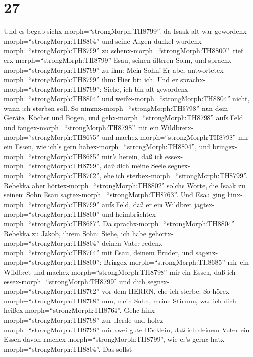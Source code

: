 \hypertarget{section-26}{%
\section{27}\label{section-26}}

 Und es begab sichx-morph=``strongMorph:TH8799'', da Isaak
alt war gewordenx-morph=``strongMorph:TH8804'' und seine Augen dunkel
wurdenx-morph=``strongMorph:TH8799'' zu
sehenx-morph=``strongMorph:TH8800'', rief
erx-morph=``strongMorph:TH8799'' Esau, seinen älteren Sohn, und
sprachx-morph=``strongMorph:TH8799'' zu ihm: Mein Sohn! Er aber
antwortetex-morph=``strongMorph:TH8799'' ihm: Hier bin ich. 
Und er sprachx-morph=``strongMorph:TH8799'': Siehe, ich bin alt
gewordenx-morph=``strongMorph:TH8804'' und
weißx-morph=``strongMorph:TH8804'' nicht, wann ich sterben soll.
 So nimmx-morph=``strongMorph:TH8798'' nun dein Geräte,
Köcher und Bogen, und gehx-morph=``strongMorph:TH8798'' aufs Feld und
fangex-morph=``strongMorph:TH8798'' mir ein
Wildbretx-morph=``strongMorph:TH8675''  und
machex-morph=``strongMorph:TH8798'' mir ein Essen, wie ich's gern
habex-morph=``strongMorph:TH8804'', und
bringex-morph=``strongMorph:TH8685'' mir's herein, daß ich
essex-morph=``strongMorph:TH8799'', daß dich meine Seele
segnex-morph=``strongMorph:TH8762'', ehe ich
sterbex-morph=``strongMorph:TH8799''.  Rebekka aber
hörtex-morph=``strongMorph:TH8802'' solche Worte, die Isaak zu seinem
Sohn Esau sagtex-morph=``strongMorph:TH8763''. Und Esau ging
hinx-morph=``strongMorph:TH8799'' aufs Feld, daß er ein Wildbret
jagtex-morph=``strongMorph:TH8800'' und
heimbrächtex-morph=``strongMorph:TH8687''.  Da
sprachx-morph=``strongMorph:TH8804'' Rebekka zu Jakob, ihrem Sohn:
Siehe, ich habe gehörtx-morph=``strongMorph:TH8804'' deinen Vater
redenx-morph=``strongMorph:TH8764'' mit Esau, deinem Bruder, und
sagenx-morph=``strongMorph:TH8800'': 
Bringex-morph=``strongMorph:TH8685'' mir ein Wildbret und
machex-morph=``strongMorph:TH8798'' mir ein Essen, daß ich
essex-morph=``strongMorph:TH8799'' und dich
segnex-morph=``strongMorph:TH8762'' vor dem HERRN, ehe ich sterbe.
 So hörex-morph=``strongMorph:TH8798'' nun, mein Sohn, meine
Stimme, was ich dich heißex-morph=``strongMorph:TH8764''. 
Gehe hinx-morph=``strongMorph:TH8798'' zur Herde und
holex-morph=``strongMorph:TH8798'' mir zwei gute Böcklein, daß ich
deinem Vater ein Essen davon machex-morph=``strongMorph:TH8799'', wie
er's gerne hatx-morph=``strongMorph:TH8804''.  Das sollst
